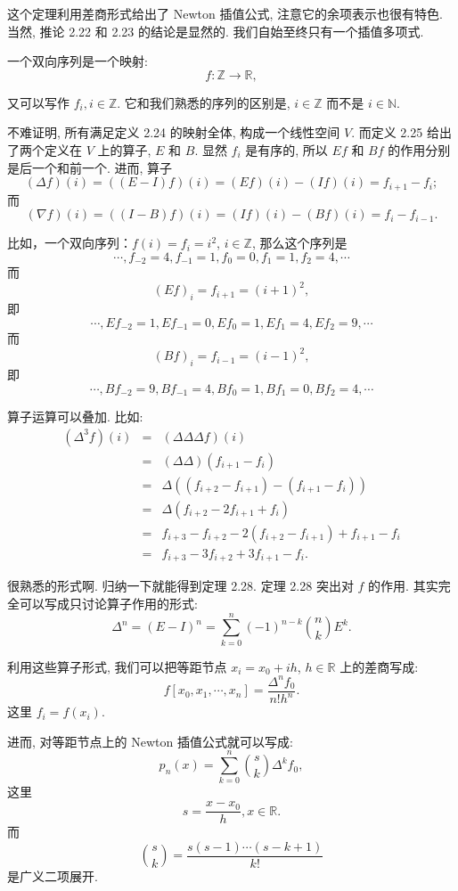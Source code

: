 \documentclass[a4paper]{ctexart}
\begin{document}
这个定理利用差商形式给出了 Newton 插值公式, 注意它的余项表示也很有特色. 
当然, 推论 2.22 和 2.23 的结论是显然的. 我们自始至终只有一个插值多项式. 

 一个双向序列是一个映射: 
$$
f : \mathbb{Z} \to \mathbb{R},
$$

又可以写作 $f_i, i \in \mathbb{Z}$. 它和我们熟悉的序列的区别是, $i \in
\mathbb{Z}$ 而不是 $i \in \mathbb{N}$.

不难证明, 所有满足定义 2.24 的映射全体, 构成一个线性空间 $V$. 而定义
2.25 给出了两个定义在 $V$ 上的算子, $E$ 和 $B$. 显然 $f_i$ 是有序的,
所以 $Ef$ 和 $Bf$ 的作用分别是后一个和前一个. 进而, 算子
$$
(\Delta f)(i) = ((E - I) f)(i) = (E f)(i) - (I f)(i) = f_{i + 1} - f_i;
$$
而
$$
(\nabla f)(i) = ((I - B) f)(i) = (I f)(i) - (B f)(i) = f_i - f_{i - 1}.
$$

比如，一个双向序列：$f(i) = f_i = i^2$, $i \in \mathbb{Z}$, 那么这个序列是
\[
\cdots, f_{-2} = 4, f_{-1} = 1, f_0 = 0, f_1 = 1, f_2 = 4, \cdots
\]
而
\[
(Ef)_i = f_{i + 1} = (i + 1)^2,
\]
即
\[
\cdots, Ef_{-2} = 1, Ef_{-1} = 0, Ef_0 = 1, Ef_1 = 4, Ef_2 = 9, \cdots
\]
而
\[
(Bf)_i = f_{i - 1} = (i - 1)^2,
\]
即
\[
\cdots, Bf_{-2} = 9, Bf_{-1} = 4, Bf_0 = 1, Bf_1 = 0, Bf_2 = 4, \cdots
\]

算子运算可以叠加. 比如:
$$
\begin{array}{rcl}
  (\Delta^3 f)(i) &=& (\Delta \Delta \Delta f)(i) \\
  &=& (\Delta \Delta) (f_{i + 1} - f_i) \\
  &=& \Delta ((f_{i + 2} - f_{i + 1}) - (f_{i + 1} - f_i)) \\
  &=& \Delta (f_{i + 2} - 2 f_{i + 1} + f_i) \\
  &=& f_{i + 3} - f_{i + 2} - 2(f_{i + 2} - f_{i + 1}) + f_{i + 1} - f_i \\
  &=& f_{i + 3} - 3 f_{i + 2} + 3 f_{i + 1} - f_i.
\end{array}
$$

很熟悉的形式啊. 归纳一下就能得到定理 2.28. 定理 2.28 突出对 $f$ 的作用.
其实完全可以写成只讨论算子作用的形式:
$$
\Delta^n = (E - I)^n = \sum_{k = 0}^n (-1)^{n - k}{n \choose k}E^k.
$$

利用这些算子形式, 我们可以把等距节点 $x_i = x_0 + ih$, $h \in
\mathbb{R}$ 上的差商写成:
$$
f[x_0, x_1, \cdots, x_n] = \frac{\Delta^n f_0}{n! h^n}.
$$
这里 $f_i = f(x_i)$.

进而, 对等距节点上的 Newton 插值公式就可以写成:
$$
p_n(x) = \sum_{k = 0}^n {s \choose k} \Delta^k f_0,
$$
这里
$$
s = \frac{x - x_0}h, x \in \mathbb{R}.
$$
而
$$
{s \choose k} = \frac{s(s - 1)\cdots(s - k + 1)}{k!}
$$
是广义二项展开.
\end{document}
